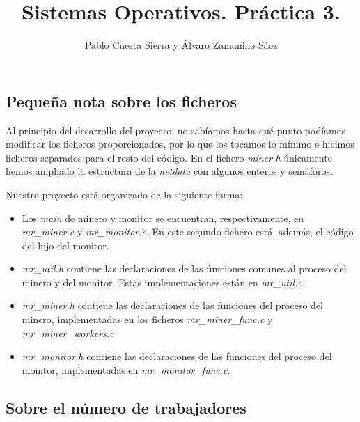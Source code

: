 \documentclass{article}
\begin{document}
\title{Sistemas Operativos. Práctica 3.}
\author{Pablo Cuesta Sierra y Álvaro Zamanillo Sáez}
\maketitle

\begin{tcolorbox}
\tableofcontents
\end{tcolorbox}

\subsection*{Pequeña nota sobre los ficheros}

Al principio del desarrollo del proyecto, no sabíamos hasta qué punto podíamos modificar los ficheros proporcionados, por lo que los tocamos lo mínimo e hicimos ficheros separados para el resto del código. En el fichero \emph{miner.h} únicamente hemos ampliado la estructura de la \emph{netdata} con algunos enteros y semáforos.

Nuestro proyecto está organizado de la siguiente forma:
\begin{itemize}
    \item
    Los \emph{main} de minero y monitor se encuentran, respectivamente, en \emph{mr\_miner.c} y \emph{mr\_monitor.c}.
    En este segundo fichero está, además, el código del hijo del monitor.
    
    \item
    \emph{mr\_util.h} contiene las declaraciones de las funciones comunes al proceso del minero y del monitor. Estas implementaciones están en \emph{mr\_util.c}.

    \item
    \emph{mr\_miner.h} contiene las declaraciones de las funciones del proceso del minero, implementadas en los ficheros \emph{mr\_miner\_func.c} y \emph{mr\_miner\_workers.c}

    \item 
    \emph{mr\_monitor.h} contiene las declaraciones de las funciones del proceso del mointor, implementadas en \emph{mr\_monitor\_func.c}.
\end{itemize}


\subsection*{Sobre el número de trabajadores}
\end{document}

